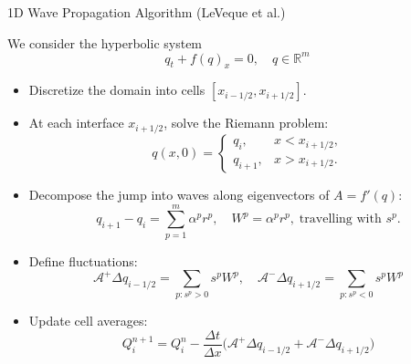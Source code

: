 
\begin{frame}{1D Wave Propagation Algorithm (LeVeque et al.)}
	\scriptsize
	
	We consider the hyperbolic system
	\[
	q_t + f(q)_x = 0, \quad q \in \mathbb{R}^m
	\]
	
	\begin{itemize}
		\item Discretize the domain into cells $[x_{i-1/2}, x_{i+1/2}]$.
		\item At each interface $x_{i+1/2}$, solve the Riemann problem:
		\[
		q(x,0) = 
		\begin{cases} 
			q_i, & x < x_{i+1/2}, \\ 
			q_{i+1}, & x > x_{i+1/2}.
		\end{cases}
		\]
		\item Decompose the jump into waves along eigenvectors of $A = f'(q)$:
		\[
		q_{i+1} - q_i = \sum_{p=1}^m \alpha^p r^p, 
		\quad W^p = \alpha^p r^p, \; \text{travelling with } s^p.
		\]
		\item Define fluctuations:
		\[
		\mathcal{A}^+ \Delta q_{i-1/2} = \sum_{p: s^p>0} s^p W^p, \quad
		\mathcal{A}^- \Delta q_{i+1/2} = \sum_{p: s^p<0} s^p W^p
		\]
		\item Update cell averages:
		\[
		Q_i^{n+1} = Q_i^n - \frac{\Delta t}{\Delta x} 
		\Big( \mathcal{A}^+ \Delta q_{i-1/2} + \mathcal{A}^- \Delta q_{i+1/2} \Big)
		\]
	\end{itemize}
\end{frame}




